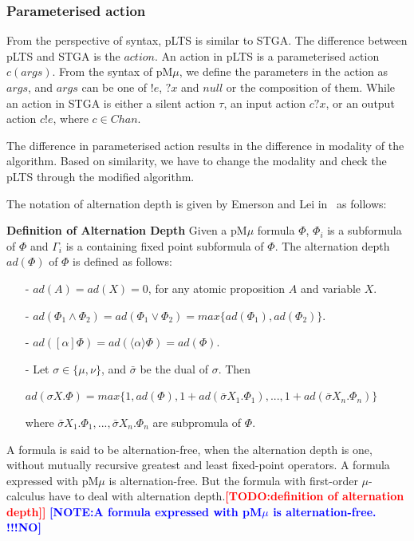 \documentclass[runningheads,a4paper]{llncs}
\newcommand{\TODO}[1]{\textcolor{red}{\textbf{[TODO:#1]}}}
\newcommand{\NOTE}[1]{\textcolor{blue}{\textbf{[NOTE:#1]}}}
\begin{document}
 
 \subsubsection{Parameterised action}
From the perspective of syntax, pLTS is similar to STGA. The difference between pLTS and STGA is the $\mathit{action}$. An action in pLTS is a parameterised action $c(args)$. From the syntax of pM$\mu$, we define the parameters in the action as $args$, and $args$ can be one of $!e$, $?x$ and $null$ or the composition of them. While an action in STGA is either a silent action $\tau$, an input action $c?x$, or an output action $c!e$, where $c\in Chan$. 

The difference in parameterised action results in the difference in modality of the algorithm. Based on similarity, we have to change the modality and check the pLTS through the modified algorithm.  

The notation of alternation depth is given by Emerson and Lei in~\cite{emerson1986alternation} as follows:

\textbf{Definition of Alternation Depth}
Given a pM$\mu$ formula $\Phi$, $\Phi_{i}$ is a subformula of $\Phi$ and $\Gamma_{i}$ is a containing fixed point subformula of $\Phi$. The alternation depth $ad(\Phi)$ of $\Phi$ is defined as follows:

\begin{itemize}
\item[-] $ad(A) = ad(X) = 0$, for any atomic proposition $A$ and variable $X$.
\item[-] $ad(\Phi_{1}\wedge\Phi_{2}) = ad(\Phi_{1}\vee\Phi_{2}) = max\{ ad(\Phi_{1}), ad(\Phi_{2})\}$.
\item[-] $ad([\alpha]\Phi) = ad(\langle\alpha\rangle\Phi) = ad(\Phi)$.
\item[-] Let $\sigma\in\{\mu,\nu\}$, and $\bar{\sigma}$ be the dual of $\sigma$. Then
	\begin{center}
	$ad(\sigma X.\Phi) = max\{1, ad(\Phi), 1+ad(\bar{\sigma} X_{1}.\Phi_{1}), ... , 1+ ad(\bar{\sigma} X_{n}.\Phi_{n})\}$
	\end{center} 
	where $\bar{\sigma} X_{1}.\Phi_{1}, ... , \bar{\sigma} X_{n}.\Phi_{n}$ are subpromula of $\Phi$.
\end{itemize}

A formula is said to be alternation-free, when the alternation depth is one, without mutually recursive greatest and least fixed-point operators. A formula expressed with pM$\mu$ is alternation-free. But the formula with first-order $\mu$-calculus have to deal with alternation depth.\TODO{definition of alternation depth]}
\NOTE{A formula expressed with pM$\mu$ is alternation-free. !!!NO}
\end{document}
